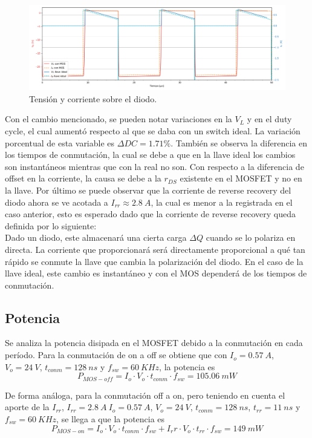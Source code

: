 \begin{figure}[H]
	\centering
	\includegraphics[width=\linewidth]{ImagenesEjercicio-3/id-vd-2v3}
	\caption{Tensión y corriente sobre el diodo.}
	\label{fig:ej3:Id_Vd}
\end{figure}

Con el cambio mencionado, se pueden notar variaciones en la $V_L$ y en el duty cycle, el cual aumentó respecto al que se daba con un switch ideal. La variación porcentual de esta variable es $\Delta DC = 1.71 \% $. También se observa la diferencia en los tiempos de conmutación, la cual se debe a que en la llave ideal los cambios son instantáneos mientras que con la real no son. Con respecto a la diferencia de offset en la corriente, la causa se debe a la $r_{DS}$ existente en el MOSFET y no en la llave. Por último se puede observar que la corriente de reverse recovery del diodo ahora se ve acotada a $I_{rr}\approx 2.8 \ A$, la cual es menor a la registrada en el caso anterior, esto es esperado dado que la corriente de reverse recovery queda definida por lo siguiente:\\
Dado un diodo, este almacenará una cierta carga $\Delta Q$ cuando se lo polariza en directa. La corriente que proporcionará será directamente proporcional a qué tan rápido se conmute la llave que cambia la polarización del diodo. En el caso de la llave ideal, este cambio es instantáneo y con el MOS dependerá de los tiempos de conmutación.


\subsection{Potencia}
Se analiza la potencia disipada en el MOSFET debido a la conmutación en cada período.
Para la conmutación de on a off se obtiene que con $I_o = 0.57 \ A$, $V_o = 24 \ V$, $t_{conm}= 128 \ ns$ y $f_{sw}=60 \ KHz$, la potencia es
\begin{equation}
P_{MOS-off}=I_o \cdot V_o \cdot t_{conm} \cdot f_{sw} = 105.06 \ mW
\end{equation}

De forma análoga, para la conmutación off a on, pero teniendo en cuenta el aporte de la $I_{rr}$, $I_{rr} = 2.8 \ A \ I_o = 0.57 \ A$, $V_o = 24 \ V$, $ t_{conm}= 128 \ ns$, $ t_{rr}= 11 \ ns$ y $f_{sw}=60 \ KHz$, se llega a que la potencia es
\begin{equation}
P_{MOS-on}=I_o \cdot V_o \cdot t_{conm} \cdot f_{sw} + I_rr \cdot V_o \cdot t_{rr} \cdot f_{sw}=  149\ mW
\end{equation}

